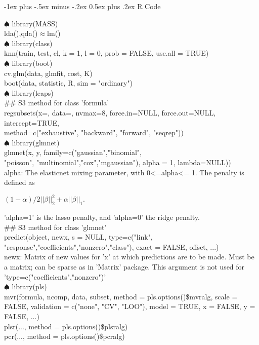 \documentclass[12pt, plandscape]{article}
\makeatletter
\renewcommand{\section}{\@startsection{section}{1}{0mm}%
                                {-1ex plus -.5ex minus -.2ex}%
                                {0.5ex plus .2ex}%
                                {\normalfont\large\bfseries}}
\makeatother
\begin{document}
\footnotesize
\begin{multicols}{3}


\setlength{\columnseprule}{0.25pt}
\setlength{\premulticols}{1pt}
\setlength{\postmulticols}{1pt}
\setlength{\multicolsep}{1pt}
\setlength{\columnsep}{2pt}


\section{R Code}

$\spadesuit$ library(MASS)\\
lda(),qda()$\approx$lm()\\
$\spadesuit$ library(class)\\
knn(train, test, cl, k = 1, l = 0, prob = FALSE, use.all = TRUE)\\
$\spadesuit$  library(boot)\\
cv.glm(data, glmfit, cost, K)\\
boot(data, statistic, R, sim = "ordinary")\\
$\spadesuit$  library(leaps)\\
\#\# S3 method for class 'formula'\\
regsubsets(x=, data=, nvmax=8, force.in=NULL, force.out=NULL, intercept=TRUE, \\
method=c("exhaustive", "backward", "forward", "seqrep"))\\
$\spadesuit$  library(glmnet)\\
glmnet(x, y, family=c("gaussian","binomial",\\
"poisson",
"multinomial","cox","mgaussian"), alpha = 1, lambda=NULL))\\
alpha: The elasticnet mixing parameter, with 0<=alpha<= 1. The
          penalty is defined as

                     $(1-\alpha)/2||\beta||_2^2+\alpha||\beta||_1.$           
          
          'alpha=1' is the lasso penalty, and 'alpha=0' the ridge
          penalty.\\
\#\# S3 method for class 'glmnet'\\
predict(object, newx, s = NULL,
     type=c("link",\\"response","coefficients","nonzero","class"), exact = FALSE, offset, ...)\\
newx: Matrix of new values for 'x' at which predictions are to be
          made. Must be a matrix; can be sparse as in 'Matrix' package.
          This argument is not used for
          'type=c("coefficients","nonzero")'\\
$\spadesuit$  library(pls)\\
mvr(formula, ncomp, data, subset, 
         method = pls.options()\$mvralg,
         scale = FALSE, validation = c("none", "CV", "LOO"),
         model = TRUE, x = FALSE, y = FALSE, ...)\\
     plsr(..., method = pls.options()\$plsralg)\\
     pcr(..., method = pls.options()\$pcralg)\\
     

\end{multicols}
\end{document}
